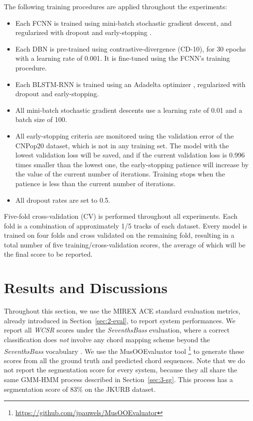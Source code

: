 The following training procedures are applied throughout the experiments: 
\begin{itemize}
	\item Each FCNN is trained using mini-batch stochastic gradient descent, and regularized with dropout \cite{srivastava2014dropout} and early-stopping \cite{prechelt1998automatic}. 
	\item Each DBN is pre-trained using contrastive-divergence \cite{hinton2006fast} (CD-10), for 30 epochs with a learning rate of 0.001. It is fine-tuned using the FCNN's training procedure.
	\item Each BLSTM-RNN is trained using an Adadelta optimizer \cite{zeiler2012adadelta}, regularized with dropout and early-stopping. 
	\item All mini-batch stochastic gradient descents use a learning rate of 0.01 and a batch size of 100. 
	\item All early-stopping criteria are monitored using the validation error of the CNPop20 dataset, which is not in any training set. The model with the lowest validation loss will be saved, and if the current validation loss is 0.996 times smaller than the lowest one, the early-stopping patience will increase by the value of the current number of iterations. Training stops when the patience is less than the current number of iterations.
	\item All dropout rates are set to 0.5. 
\end{itemize}
Five-fold cross-validation (CV) is performed throughout all experiments. Each fold is a combination of approximately 1/5 tracks of each dataset. Every model is trained on four folds and cross validated on the remaining fold, resulting in a total number of five training/cross-validation scores, the average of which will be the final score to be reported.


\section{Results and Discussions} \label{sec:3-res}
Throughout this section, we use the MIREX ACE standard evaluation metrics, already introduced in Section~\ref{sec:2-eval}, to report system performances. We report all \textit{WCSR} scores under the \textit{SeventhsBass} evaluation, where a correct classification does {\it not} involve any chord mapping scheme beyond the \textit{SeventhsBass} vocabulary \cite{pauwels2013evaluating}. We use the MusOOEvaluator tool \footnote{\url{https://github.com/jpauwels/MusOOEvaluator}} to generate these scores from all the ground truth and predicted chord sequences. Note that we do not report the segmentation score for every system, because they all share the same GMM-HMM process described in Section~\ref{sec:3-sg}. This process has a segmentation score of 83\% on the JKURB dataset.

